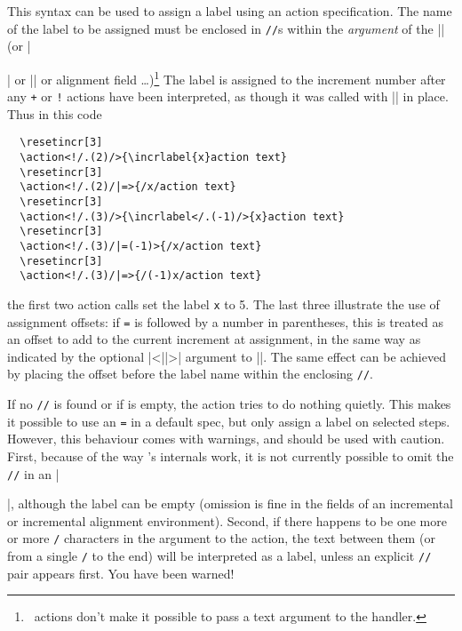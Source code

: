 \documentclass[a4paper]{ltxdoc}
\makeatletter
\def\textpipe{\char`\|}
\def\pdfindxcmd#1#2@{\belowpdfbookmark{\textbackslash\stripcommand#1}{\stripcommand#1}}%
\def\pdfindxcmdalt#1#2{\belowpdfbookmark{#1}{#2}}%
\let\oldcommand\command
\def\command#1{\pdfindxcmd#1@\oldcommand{#1}}
\newenvironment{commandalt}{\@ifnextchar[{\@commandalt}{\@commandalt@noopt}}{\endcommand}
\def\@commandalt[#1]{\@ifnextchar[{\@commandalt@twoopt[#1]}{\@commandalt@oneopt[#1]}}
\def\@commandalt@noopt#1{\pdfindxcmdalt{#1}{#1}\oldcommand{#1}}
\def\@commandalt@oneopt[#1]#2{\pdfindxcmdalt{#1}{#1}\oldcommand{#2}}
\def\@commandalt@twoopt[#1][#2]#3{\pdfindxcmdalt{#1}{#2}\oldcommand{#3}}
\def\cmdcontd#1{\textcolor{red}{\texttt{#1}}}
\makeatother
\begin{document}
\begin{commandalt}[<=>/label/]{{<$\cdots$\textpipe=}\opt{\texttt{(\meta{offset})}}\cmdcontd{\textpipe$\cdots$>}
    \texttt\{\dots \texttt{/\meta{label}/} \dots\texttt\}}
  This syntax can be used to assign a label using an action specification.  The
  name of the label to be assigned must be enclosed in \texttt{//}s within the
  \emph{argument} of the |\action| (or |\item| or |\next| or alignment field
  \dots)\footnote{\beamer\ actions don't make it possible to pass a text
  argument to the handler.}  The label is assigned to the increment number after
  any \texttt{+} or \texttt{!} actions have been interpreted, as though it was
  called with |\incrlabel| in place.  Thus in this code \example
\begin{verbatim}
  \resetincr[3]
  \action<!/.(2)/>{\incrlabel{x}action text}
  \resetincr[3]
  \action<!/.(2)/|=>{/x/action text}
  \resetincr[3]
  \action<!/.(3)/>{\incrlabel</.(-1)/>{x}action text}
  \resetincr[3]
  \action<!/.(3)/|=(-1)>{/x/action text}
  \resetincr[3]
  \action<!/.(3)/|=>{/(-1)x/action text}
\end{verbatim}
the first two action calls set the label \texttt{x} to 5.  The last three
illustrate the use of assignment offsets: if \texttt{=} is followed by a number
in parentheses, this is treated as an offset to add to the current increment at
assignment, in the same way as indicated by the optional |<||>|
argument to |\incrlabel|.  The same effect can be achieved by placing the offset
before the label name within the enclosing \texttt{//}.

If no \texttt/\texttt/ is found or if  is empty, the
action tries to do nothing quietly.  This makes it possible to use an \texttt{=}
in a default spec, but only assign a label on selected steps.  However, this
behaviour comes with warnings, and should be used with caution.  First, because
of the way \beamer's internals work, it is not currently possible to omit the
\texttt{//} in an |\item|, although the label can be empty (omission is fine in
the fields of an incremental or incremental alignment environment).  Second, if
there happens to be one more or more \texttt{/} characters in the argument to
the action, the text between them (or from a single \texttt{/} to the end) will
be interpreted as a label, unless an explicit \texttt{//} pair appears first.
You have been warned!
\end{commandalt}
\end{document}
